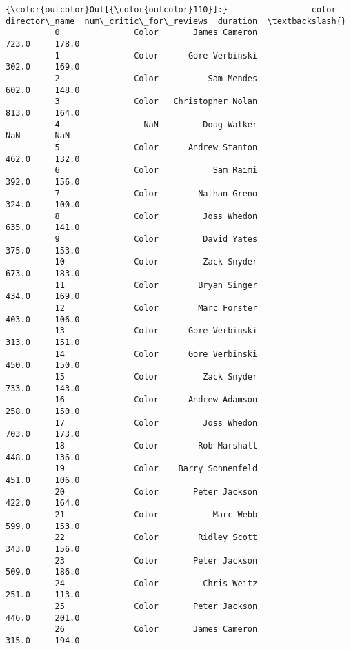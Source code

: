 \documentclass[11pt]{article}
\begin{document}
\begin{Verbatim}[commandchars=\\\{\}]
{\color{outcolor}Out[{\color{outcolor}110}]:}                 color       director\_name  num\_critic\_for\_reviews  duration  \textbackslash{}
          0               Color       James Cameron                   723.0     178.0   
          1               Color      Gore Verbinski                   302.0     169.0   
          2               Color          Sam Mendes                   602.0     148.0   
          3               Color   Christopher Nolan                   813.0     164.0   
          4                 NaN         Doug Walker                     NaN       NaN   
          5               Color      Andrew Stanton                   462.0     132.0   
          6               Color           Sam Raimi                   392.0     156.0   
          7               Color        Nathan Greno                   324.0     100.0   
          8               Color         Joss Whedon                   635.0     141.0   
          9               Color         David Yates                   375.0     153.0   
          10              Color         Zack Snyder                   673.0     183.0   
          11              Color        Bryan Singer                   434.0     169.0   
          12              Color        Marc Forster                   403.0     106.0   
          13              Color      Gore Verbinski                   313.0     151.0   
          14              Color      Gore Verbinski                   450.0     150.0   
          15              Color         Zack Snyder                   733.0     143.0   
          16              Color      Andrew Adamson                   258.0     150.0   
          17              Color         Joss Whedon                   703.0     173.0   
          18              Color        Rob Marshall                   448.0     136.0   
          19              Color    Barry Sonnenfeld                   451.0     106.0   
          20              Color       Peter Jackson                   422.0     164.0   
          21              Color           Marc Webb                   599.0     153.0   
          22              Color        Ridley Scott                   343.0     156.0   
          23              Color       Peter Jackson                   509.0     186.0   
          24              Color         Chris Weitz                   251.0     113.0   
          25              Color       Peter Jackson                   446.0     201.0   
          26              Color       James Cameron                   315.0     194.0   

\end{Verbatim}
\end{document}
